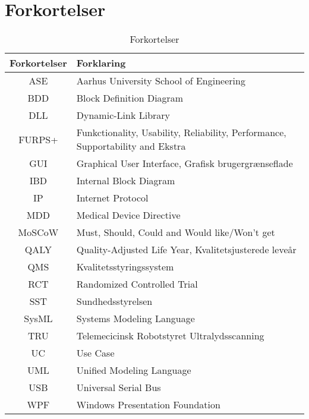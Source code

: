 \chapter{Forkortelser}

\begin{table}[htb]
\centering
\begin{tabular}{ | c | p{} | }
\hline
\textbf{Forkortelser} & \textbf{Forklaring} \\\hline
ASE & Aarhus University School of Engineering \\\hline
BDD & Block Definition Diagram \\\hline
DLL & Dynamic-Link Library \\\hline
FURPS+ & Funkctionality, Usability, Reliability, Performance, Supportability and Ekstra \\\hline
GUI & Graphical User Interface, Grafisk brugergrænseflade \\\hline
IBD & Internal Block Diagram \\\hline
IP & Internet Protocol \\\hline
MDD & Medical Device Directive \\\hline
MoSCoW & Must, Should, Could and Would like/Won't get\\\hline
QALY & Quality-Adjusted Life Year, Kvalitetsjusterede leveår  \\\hline
QMS & Kvalitetsstyringssystem \\\hline
RCT & Randomized Controlled Trial \\\hline
SST & Sundhedsstyrelsen \\\hline
SysML & Systems Modeling Language \\\hline
TRU & Telemecicinsk Robotstyret Ultralydsscanning \\\hline
UC & Use Case \\\hline
UML & Unified Modeling Language \\\hline
USB & Universal Serial Bus \\\hline
WPF & Windows Presentation Foundation \\\hline

\end{tabular}
\caption{Forkortelser}
\end{table}

\vspace{3cm}